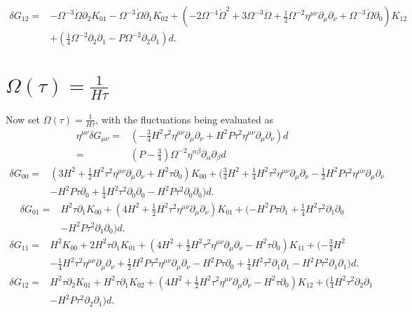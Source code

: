 \documentclass[10pt,letterpaper]{article}
\begin{document}
\begin{align}
\delta G_{12}={}&- \Omega^{-3} \dot{\Omega} \partial_{2} K_{01}
 -  \Omega^{-3} \dot{\Omega} \partial_{1} K_{02}
 + (-2 \Omega^{-4} \dot{\Omega}^2
 + 3 \Omega^{-3} \ddot{\Omega}
 + \tfrac{1}{2} \Omega^{-2} \eta^{\mu \nu} \partial_{\mu} \partial_{\nu}
 + \Omega^{-3} \dot{\Omega} \partial_{0}) K_{12}\nonumber\\
& + (\tfrac{1}{4} \Omega^{-2} \partial_{2} \partial_{1}
 -  P \Omega^{-2} \partial_{2} \partial_{1}) d.
\end{align}
\section*{$\Omega(\tau)=\tfrac{1}{H\tau}$}
Now set $\Omega(\tau) = \frac{1}{H\tau}$, with the fluctuations being evaluated as
\begin{align}
\eta^{\mu\nu}\delta G_{\mu\nu} =&{}
(- \tfrac{3}{4} H^2 \tau^2 \eta^{\mu \nu} \partial_{\mu} \partial_{\nu} + H^2 P \tau^2 \eta^{\mu \nu} \partial_{\mu} \partial_{\nu}) d\nonumber\\
=&{}(P-\tfrac34) \Omega^{-2}\eta^{\alpha\beta}\partial_\alpha\partial_\beta d
\end{align}
\begin{align}
\delta G_{00}={}&(3 H^2
 + \tfrac{1}{2} H^2 \tau^2 \eta^{\mu \nu} \partial_{\mu} \partial_{\nu}
 + H^2 \tau \partial_{0}) K_{00}
 + (\tfrac{3}{4} H^2
 + \tfrac{1}{4} H^2 \tau^2 \eta^{\mu \nu} \partial_{\mu} \partial_{\nu}
 -  \tfrac{1}{2} H^2 P \tau^2 \eta^{\mu \nu} \partial_{\mu} \partial_{\nu}\nonumber\\
& -  H^2 P \tau \partial_{0}
 + \tfrac{1}{4} H^2 \tau^2 \partial_{0} \partial_{0}
 -  H^2 P \tau^2 \partial_{0} \partial_{0}) d.
\end{align}
\begin{align}
\delta G_{01}={}&H^2 \tau \partial_{1} K_{00}
 + (4 H^2
 + \tfrac{1}{2} H^2 \tau^2 \eta^{\mu \nu} \partial_{\mu} \partial_{\nu}) K_{01}
 + (- H^2 P \tau \partial_{1}
 + \tfrac{1}{4} H^2 \tau^2 \partial_{1} \partial_{0}\nonumber\\
& -  H^2 P \tau^2 \partial_{1} \partial_{0}) d.
\end{align}
\begin{align}
\delta G_{11}={}&H^2 K_{00}
 + 2 H^2 \tau \partial_{1} K_{01}
 + (4 H^2
 + \tfrac{1}{2} H^2 \tau^2 \eta^{\mu \nu} \partial_{\mu} \partial_{\nu}
 -  H^2 \tau \partial_{0}) K_{11}
 + (- \tfrac{3}{4} H^2\nonumber\\
& -  \tfrac{1}{4} H^2 \tau^2 \eta^{\mu \nu} \partial_{\mu} \partial_{\nu}
 + \tfrac{1}{2} H^2 P \tau^2 \eta^{\mu \nu} \partial_{\mu} \partial_{\nu}
 -  H^2 P \tau \partial_{0}
 + \tfrac{1}{4} H^2 \tau^2 \partial_{1} \partial_{1}
 -  H^2 P \tau^2 \partial_{1} \partial_{1}) d.
\end{align}
\begin{align}
\delta G_{12}={}&H^2 \tau \partial_{2} K_{01}
 + H^2 \tau \partial_{1} K_{02}
 + (4 H^2
 + \tfrac{1}{2} H^2 \tau^2 \eta^{\mu \nu} \partial_{\mu} \partial_{\nu}
 -  H^2 \tau \partial_{0}) K_{12}
 + (\tfrac{1}{4} H^2 \tau^2 \partial_{2} \partial_{1}\nonumber\\
& -  H^2 P \tau^2 \partial_{2} \partial_{1}) d.
\end{align}
\end{document}
